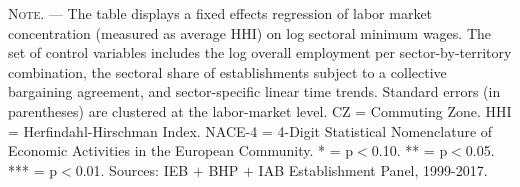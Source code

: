 \documentclass[11pt,oneside,reqno,xcolor=dvipsnames]{article} %
\begin{document}
\begin{appendix}
\begin{refsection}
\begin{landscape}
\begin{table}[!ht]
{\begin{threeparttable}
\begin{tablenotes}
\item \footnotesize \textsc{Note. ---} The table displays a fixed effects regression of labor market concentration (measured as average HHI) on log sectoral minimum wages. The set of control variables includes the log overall employment per sector-by-territory combination, the sectoral share of establishments subject to a collective bargaining agreement, and sector-specific linear time trends. Standard errors (in parentheses) are clustered at the labor-market level. CZ = Commuting Zone. HHI = Herfindahl-Hirschman Index. NACE-4 = 4-Digit Statistical Nomenclature of Economic Activities in the European Community. * = p$<$0.10. ** = p$<$0.05. *** = p$<$0.01. Sources: IEB $\plus$ BHP $\plus$ IAB Establishment Panel, 1999-2017.
\end{tablenotes}
\end{threeparttable}
}
\end{table}



\vspace*{\fill}
\clearpage
\vspace*{\fill}




\end{landscape}
\end{refsection}
\end{appendix}
\end{document}
